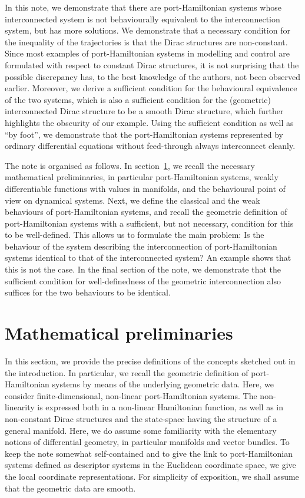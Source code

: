 \documentclass[preprint,12pt]{elsarticle}
\theoremstyle{definition}
\begin{document}
In this note, we demonstrate that there are port-Hamiltonian systems whose interconnected system is not behaviourally equivalent to the interconnection system, but has more solutions. We demonstrate that a necessary condition for the inequality of the trajectories is that the Dirac structures are non-constant. Since most examples of port-Hamiltonian systems in modelling and control are formulated with respect to constant Dirac structures, it is not surprising that the possible discrepancy has, to the best knowledge of the authors, not been observed earlier. Moreover, we derive a sufficient condition for the behavioural equivalence of the two systems, which is also a sufficient condition for the (geometric) interconnected Dirac structure to be a smooth Dirac structure, which further highlights the obscurity of our example. Using the sufficient condition as well as ``by foot'', we demonstrate that the port-Hamiltonian systems represented by ordinary differential equations without feed-through always interconnect cleanly.

The note is organised as follows. In section~\ref{sec:prelim}, we recall the necessary mathematical preliminaries, in particular port-Hamiltonian systems, weakly differentiable functions with values in manifolds, and the behavioural point of view on dynamical systems. Next, we define the classical and the weak behaviours of port-Hamiltonian systems, and recall the geometric definition of port-Hamiltonian systems with a sufficient, but not necessary, condition for this to be well-defined. This allows us to formulate the main problem: Is the behaviour of the system describing the interconnection of port-Hamiltonian systems identical to that of the interconnected system? An example shows that this is not the case. In the final section of the note, we demonstrate that the sufficient condition for well-definedness of the geometric interconnection also suffices for the two behaviours to be identical.

\section{Mathematical preliminaries}\label{sec:prelim}

In this section, we provide the precise definitions of the concepts sketched out in the introduction. In particular, we recall the geometric definition of port-Hamiltonian systems by means of the underlying geometric data. Here, we consider finite-dimensional, non-linear port-Hamiltonian systems. The non-linearity is expressed both in a non-linear Hamiltonian function, as well as in non-constant Dirac structures and the state-space having the structure of a general manifold. Here, we do assume some familiarity with the elementary notions of differential geometry, in particular manifolds and vector bundles. To keep the note somewhat self-contained and to give the link to port-Hamiltonian systems defined as descriptor systems in the Euclidean coordinate space, we give the local coordinate representations. For simplicity of exposition, we shall assume that the geometric data are smooth. 
\end{document}
